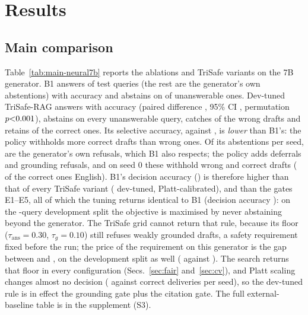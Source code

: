 \section{Results}\label{sec:results}

\subsection{Main comparison}

Table~\ref{tab:main-neural7b} reports the ablations and TriSafe variants on the 7B generator. B1 answers \LBoneAns{} of test queries (the rest are the generator's own abstentions) with accuracy \LBoneAcc{} and abstains on \LBoneUnans{} of unanswerable ones. Dev-tuned TriSafe-RAG answers \LTunAns{} with accuracy \LTunAcc{} (paired difference \LTunDeltaAcc, 95\% CI \LTunDeltaAccCI, permutation $p\LTunPcorrect$), abstains on every unanswerable query, catches \LTunCatch{} of the wrong drafts and retains \LTunRetain{} of the correct ones. Its selective accuracy, \LTunSel{} against \LBoneSel, is \emph{lower} than B1's: the policy withholds more correct drafts than wrong ones. Of its \LTunAbstN{} abstentions per seed, \LTunReasonmodelabstained{} are the generator's own refusals, which B1 also respects; the policy adds \LTunReasonborderlineevidence{} deferrals and \LTunReasonweakgrounding{} grounding refusals, and on seed 0 these withhold \LCaughtAll{} wrong and \LLostAll{} correct drafts (\LLosten{} of the correct ones English). B1's decision accuracy (\LBoneDec) is therefore higher than that of every TriSafe variant (\LTunDec{} dev-tuned, \LTPlattDec{} Platt-calibrated), and than the gates E1--E5, all of which the tuning returns identical to B1 (decision accuracy \LEoneDec): on the \Lndev-query development split the objective is maximised by never abstaining beyond the generator. The TriSafe grid cannot return that rule, because its floor ($\tau_{\mathrm{ans}}{=}0.30$, $\tau_g{=}0.10$) still refuses weakly grounded drafts, a safety requirement fixed before the run; the price of the requirement on this generator is the gap between \LTunDec{} and \LBoneDec, on the development split as well (\LTunDevDec{} against \LBoneDevDec). The search returns that floor in every configuration (Secs.~\ref{sec:fair} and~\ref{sec:cv}), and Platt scaling changes almost no decision (\LTPlattCorrect{} against \LTunCorrect{} correct deliveries per seed), so the dev-tuned rule is in effect the grounding gate plus the citation gate. The full external-baseline table is in the supplement (S3).


